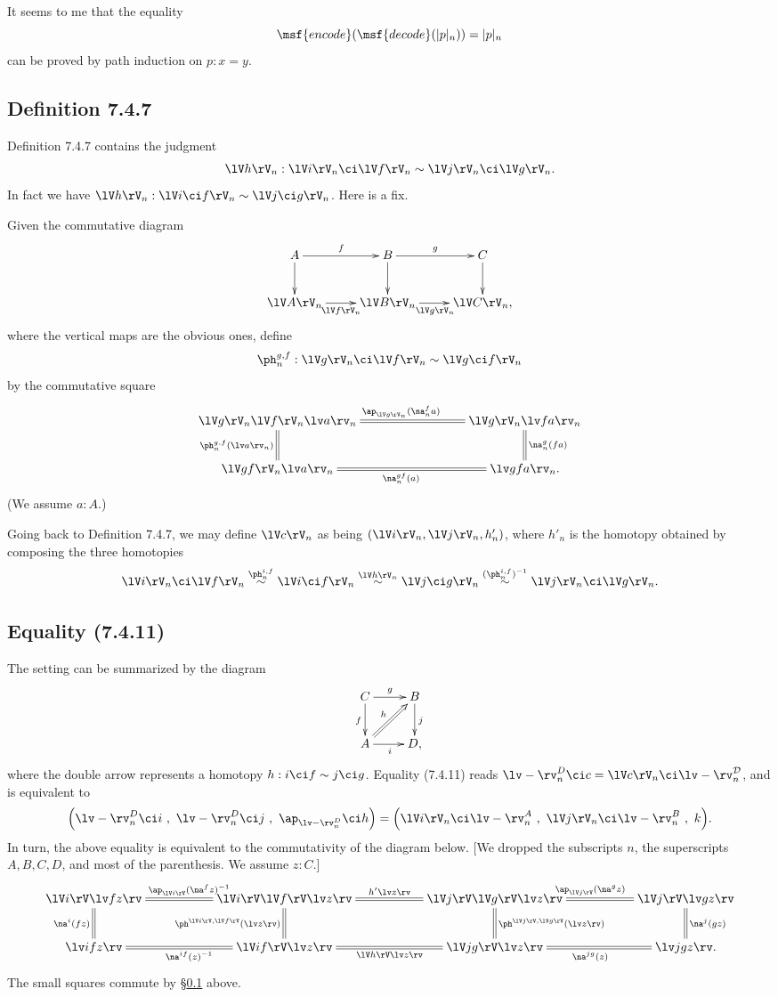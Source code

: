 \documentclass[12pt]{article}
\begin{document}
It seems to me that the equality 
$$
\msf{encode}(\msf{decode}(\lvert p\rvert_n))=\lvert p\rvert_n
$$ 
can be proved by path induction on $p:x=y$.


\subsection{Definition 7.4.7}\label{747}

Definition 7.4.7 contains the judgment 
$$
\lV h\rV_n:\lV i\rV_n\ci\lV f\rV_n\sim\lV j\rV_n\ci\lV g\rV_n.
$$ 
In fact we have $\lV h\rV_n:\lV i\ci f\rV_n\sim\lV j\ci g\rV_n$. Here is a fix. 

Given the commutative diagram
$$
\xymatrix{
A\ar[r]^f\ar[d]&B\ar[r]^g\ar[d]&C\ar[d]\\
\lV A\rV_n\ar[r]_{\lV f\rV_n}&\lV B\rV_n\ar[r]_{\lV g\rV_n}&\lV C\rV_n,}
$$ 
where the vertical maps are the obvious ones, define 
$$
\ph_n^{g,f}:\lV g\rV_n\ci\lV f\rV_n\sim\lV g\ci f\rV_n
$$ 
by the commutative square 
$$
\xymatrix{
\lV g\rV_n\lV f\rV_n\lv a\rv_n\ar@{=}[d]_{\ph_n^{g,f}(\lv a\rv_n)}\ar@{=}[rrr]^{\ap_{\lV g\rV_n}(\na_n^fa)}&&&
\lV g\rV_n\lv fa\rv_n\ar@{=}[d]^{\na_n^g(fa)}\\
\lV gf\rV_n\lv a\rv_n\ar@{=}[rrr]_{\na_n^{gf}(a)}&&&\lv gfa\rv_n.}
$$ 
(We assume $a:A$.)

Going back to Definition 7.4.7, we may define $\lV c\rV_n$ as being $(\lV i\rV_n,\lV j\rV_n,h'_n)$, where $h'_n$ is the homotopy obtained by composing the three homotopies
$$
\lV i\rV_n\ci\lV f\rV_n\overset{\ph_n^{i,f}}{\sim}\lV i\ci f\rV_n\overset{\lV h\rV_n}{\sim}\lV j\ci g\rV_n\overset{(\ph_n^{i,f})^{-1}}{\sim}\lV j\rV_n\ci\lV g\rV_n.
$$


\subsection{Equality (7.4.11)}

The setting can be summarized by the diagram 
$$
\xymatrix{C\ar[r]^g\ar[d]_f&B\ar[d]^j\\ A\ar[r]_i\ar@{=>}[ur]^h&D,}
$$ 
where the double arrow represents a homotopy $h:i\ci f\sim j\ci g$. Equality (7.4.11) reads $\lv-\rv^D_n\ci c=\lV c\rV_n\ci\lv-\rv^{\mathcal D}_n$, and is equivalent to
$$
\Big(\lv-\rv^D_n\ci i\ ,\ \lv-\rv^D_n\ci j\ ,\ \ap_{\lv-\rv^D_n}\ci h\Big)
=
\Big(\lV i\rV_n\ci\lv-\rv^A_n\ ,\ \lV j\rV_n\ci\lv-\rv^B_n\ ,\ k\Big).
$$
In turn, the above equality is equivalent to the commutativity of the diagram below. [We dropped the subscripts $n$, the superscripts $A,B,C,D$, and most of the parenthesis. We assume $z:C$.] 
$$ 
\xymatrix{
\lV i\rV\lv fz\rv\ar@{=}[d]_{\na^i(fz)}&&
\lV i\rV\lV f\rV\lv z\rv\ar@{=}[ll]_{\ap_{\lV i\rV}(\na^fz)^{-1}}\ar@{=}[d]_{\ph^{\lV i\rV,\lV f\rV}(\lv z\rv)}\ar@{=}[rr]^{h'\lv z\rv}&&
\lV j\rV\lV g\rV\lv z\rv\ar@{=}[d]^{\ph^{\lV j\rV,\lV g\rV}(\lv z\rv)}\ar@{=}[rr]^{\ap_{\lV j\rV}(\na^gz)}&&
\lV j\rV\lv gz\rv\ar@{=}[d]^{\na^j(gz)}\\
%
\lv ifz\rv&&\lV if\rV\lv z\rv\ar@{=}[rr]_{\lV h\rV\lv z\rv}\ar@{=}[ll]^{\na^{if}(z)^{-1}}&&\lV jg\rV\lv z\rv\ar@{=}[rr]_{\na^{jg}(z)}&&\lv jgz\rv.}
$$ 
The small squares commute by \S\ref{747} above.
\end{document}
